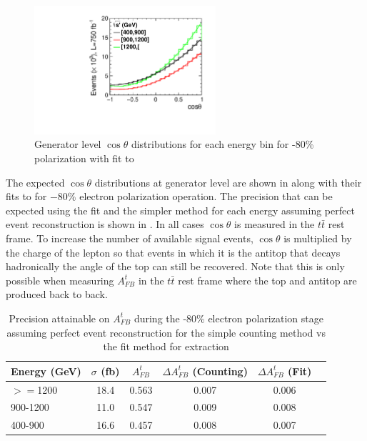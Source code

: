 \begin{figure}
  \centering
  \includegraphics[width=0.6\textwidth]{TopAnalysis/figures/GeneratorTheta.pdf}
  \caption[Generator level $\cos\theta$ distributions for each energy bin]{Generator level $\cos\theta$ distributions for each energy bin for -80\% polarization with fit to }
  \label{fig:mctheta}
\end{figure}

The expected $\cos\theta$ distributions at generator level are shown in  along with their fits to  for $-$80\% electron polarization operation. The precision that can be expected using the fit and the simpler method for each energy assuming perfect event reconstruction is shown in . In all cases $\cos\theta$ is measured in the $t\bar{t}$ rest frame. To increase the number of available signal events, $\cos\theta$ is multiplied by the charge of the lepton so that events in which it is the antitop that decays hadronically the angle of the top can still be recovered. Note that this is only possible when measuring $A_{FB}^t$ in the $t\bar{t}$ rest frame where the top and antitop are produced back to back.

\begin{table}
  \centering
  \begin{tabular}{l|c|c|c|c|c}
    \toprule
    Energy (GeV) &  $\sigma$ (fb)   & $A_{FB}^t$ & $\Delta A^t_{FB}$ (Counting) & $\Delta A_{FB}^t$ (Fit) \\
    \midrule
    $>=$1200 & 18.4  & 0.563 & 0.007 & 0.006 \\
    \midrule
    900-1200 & 11.0 & 0.547 & 0.009 & 0.008 \\
    \midrule
    400-900 & 16.6 & 0.457 & 0.008 & 0.007 \\
    \bottomrule
  \end{tabular}
  \caption{Precision attainable on $A_{FB}^t$ during the -80\% electron polarization stage assuming perfect event reconstruction for the simple counting method vs the fit method for extraction}
  \label{table:idealresults}
\end{table}


